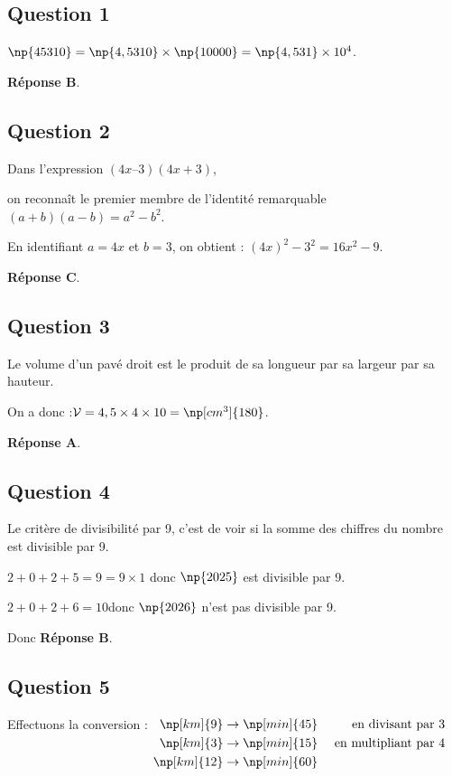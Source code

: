 	\subsection*{Question 1}
		$\np{45310}=\np{4,5310}\times \np{10000}=\np{4,531}\times 10^4$.

		\textbf{Réponse B}.

	\subsection*{Question 2}
		Dans l'expression \quad $(4x – 3)(4x + 3)$,

		on reconnaît le premier membre de l'identité remarquable \quad $(a+b)(a-b)=a^2-b^2$.

		En identifiant $a=4x$ et $b=3$, on obtient : \quad $(4x)^2-3^2=16x^2-9$.

		\textbf{Réponse C}.

	\subsection*{Question 3}
		Le volume d'un pavé droit est le produit de sa longueur par sa largeur par sa hauteur.

		On a donc :\quad $\mathcal{V}=4,5\times 4\times 10=\np[cm^3]{180}$.

		\textbf{Réponse A}.

	\subsection*{Question 4}
		Le critère de divisibilité par 9, c'est de voir si la somme des chiffres du nombre est divisible par 9.

		$2+0+2+5=9 = 9 \times 1$ \quad donc $\np{2025}$ est divisible par 9.

		$2+0+2+6=10 $\quad donc \quad $\np{2026}$ n'est pas divisible par 9.

		Donc \textbf{Réponse B}.

	\subsection*{Question 5}
		Effectuons la conversion :
		\quad
		$\begin{aligned}[t]
		\np[km]{9}  &\to  \np[min]{45} &\text{ en divisant par 3}\\
		\np[km]{3}  &\to  \np[min]{15} & \text{ en multipliant par 4}\\
		\np[km]{12} &\to  \np[min]{60} & \\
		\end{aligned}$

